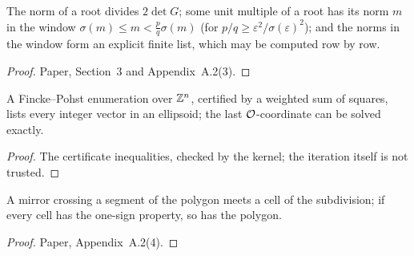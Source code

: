 \begin{lemma}\label{lem:rootnorms}
\leanok
{}
The norm of a root divides $2\det G$; some unit multiple of a root has its norm $m$ in the
window $\sigma(m)\le m<\frac pq\sigma(m)$ (for $p/q\ge\varepsilon^2/\sigma(\varepsilon)^2$); and the
norms in the window form an explicit finite list, which may be computed row by row.
\end{lemma}
\begin{proof}\leanok
Paper, Section~3 and Appendix~A.2(3).
\end{proof}

\begin{lemma}[enumeration, (5)]\label{lem:enum}
\leanok
{}
A Fincke--Pohst enumeration over $\mathbb{Z}^n$, certified by a weighted sum of squares, lists
every integer vector in an ellipsoid; the last $\mathcal{O}$-coordinate can be solved exactly.
\end{lemma}
\begin{proof}\leanok
The certificate inequalities, checked by the kernel; the iteration itself is not trusted.
\end{proof}

\begin{lemma}\label{lem:cells}
\leanok
{}
A mirror crossing a segment of the polygon meets a cell of the subdivision; if every cell has
the one-sign property, so has the polygon.
\end{lemma}
\begin{proof}\leanok
Paper, Appendix~A.2(4).
\end{proof}

